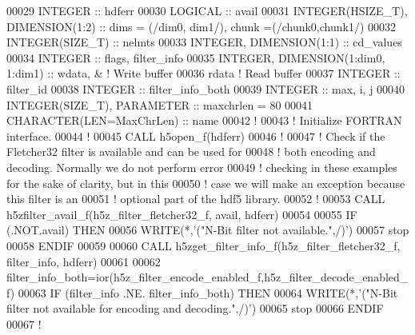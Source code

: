 \begin{DoxyCode}
00029   \textcolor{keywordtype}{INTEGER}         :: hdferr
00030   \textcolor{keywordtype}{LOGICAL}         :: avail
00031   \textcolor{keywordtype}{INTEGER(HSIZE\_T)}, \textcolor{keywordtype}{DIMENSION(1:2)} :: dims = (/dim0, dim1/), chunk =(/chunk0,chunk1/)
00032   \textcolor{keywordtype}{INTEGER(SIZE\_T)} :: nelmts
00033   \textcolor{keywordtype}{INTEGER}, \textcolor{keywordtype}{DIMENSION(1:1)} :: cd\_values
00034   \textcolor{keywordtype}{INTEGER} :: flags, filter\_info
00035   \textcolor{keywordtype}{INTEGER}, \textcolor{keywordtype}{DIMENSION(1:dim0, 1:dim1)} :: wdata, & \textcolor{comment}{! Write buffer }
00036                                         rdata    \textcolor{comment}{! Read buffer}
00037   \textcolor{keywordtype}{INTEGER} :: filter\_id
00038   \textcolor{keywordtype}{INTEGER} :: filter\_info\_both
00039   \textcolor{keywordtype}{INTEGER} :: max, i, j
00040   \textcolor{keywordtype}{INTEGER(SIZE\_T)}, \textcolor{keywordtype}{PARAMETER} :: maxchrlen = 80
00041   \textcolor{keywordtype}{CHARACTER(LEN=MaxChrLen)} :: name  
00042   \textcolor{comment}{!}
00043   \textcolor{comment}{! Initialize FORTRAN interface.}
00044   \textcolor{comment}{!}
00045   \textcolor{keyword}{CALL }h5open\_f(hdferr)
00046   \textcolor{comment}{!}
00047   \textcolor{comment}{! Check if the Fletcher32 filter is available and can be used for}
00048   \textcolor{comment}{! both encoding and decoding.  Normally we do not perform error}
00049   \textcolor{comment}{! checking in these examples for the sake of clarity, but in this}
00050   \textcolor{comment}{! case we will make an exception because this filter is an}
00051   \textcolor{comment}{! optional part of the hdf5 library.}
00052   \textcolor{comment}{!}
00053   \textcolor{keyword}{CALL }h5zfilter\_avail\_f(h5z\_filter\_fletcher32\_f, avail, hdferr)
00054 
00055   \textcolor{keywordflow}{IF} (.NOT.avail) \textcolor{keywordflow}{THEN}
00056      \textcolor{keyword}{WRITE}(*,\textcolor{stringliteral}{'("N-Bit filter not available.",/)'})
00057      stop
00058 \textcolor{keywordflow}{  ENDIF}
00059 
00060   \textcolor{keyword}{CALL }h5zget\_filter\_info\_f(h5z\_filter\_fletcher32\_f, filter\_info, hdferr)
00061 
00062   filter\_info\_both=ior(h5z\_filter\_encode\_enabled\_f,h5z\_filter\_decode\_enabled\_f)
00063   \textcolor{keywordflow}{IF} (filter\_info .NE. filter\_info\_both) \textcolor{keywordflow}{THEN}
00064      \textcolor{keyword}{WRITE}(*,\textcolor{stringliteral}{'("N-Bit filter not available for encoding and decoding.",/)'})
00065      stop
00066 \textcolor{keywordflow}{  ENDIF}
00067   \textcolor{comment}{!}

\end{DoxyCode}
